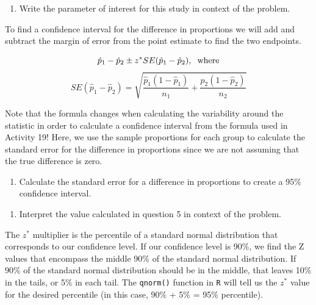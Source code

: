 \documentclass[
]{report}
\providecommand{\tightlist}{%
  \setlength{\itemsep}{0pt}\setlength{\parskip}{0pt}}
\begin{document}
\vspace{1in}

\begin{enumerate}
\def\labelenumi{\arabic{enumi}.}
\setcounter{enumi}{4}
\tightlist
\item
  Write the parameter of interest for this study in context of the problem.
\end{enumerate}

\vspace{0.8in}

To find a confidence interval for the difference in proportions we will add and subtract the margin of error from the point estimate to find the two endpoints.

\[\hat{p}_1-\hat{p}_2\pm z^*SE(\hat{p}_1-\hat{p}_2), \hspace{.2cm} \text{where}\]
\[SE(\hat{p}_1-\hat{p}_2) = \sqrt{\frac{\hat{p}_1 (1-\hat{p}_1)}{n_1}+\frac{\hat{p}_2 (1-\hat{p}_2)}{n_2}}\]

Note that the formula changes when calculating the variability around the statistic in order to calculate a confidence interval from the formula used in Activity 19! Here, we use the sample proportions for each group to calculate the standard error for the difference in proportions since we are not assuming that the true difference is zero.

\begin{enumerate}
\def\labelenumi{\arabic{enumi}.}
\setcounter{enumi}{5}
\tightlist
\item
  Calculate the standard error for a difference in proportions to create a 95\% confidence interval.
\end{enumerate}

\vspace{1in}

\begin{enumerate}
\def\labelenumi{\arabic{enumi}.}
\setcounter{enumi}{6}
\tightlist
\item
  Interpret the value calculated in question 5 in context of the problem.
\end{enumerate}

\vspace{1in}

\newpage

The \(z^*\) multiplier is the percentile of a standard normal distribution that corresponds to our confidence level. If our confidence level is 90\%, we find the Z values that encompass the middle 90\% of the standard normal distribution. If 90\% of the standard normal distribution should be in the middle, that leaves 10\% in the tails, or 5\% in each tail. The \texttt{qnorm()} function in \texttt{R} will tell us the \(z^*\) value for the desired percentile (in this case, 90\% + 5\% = 95\% percentile).
\end{document}
